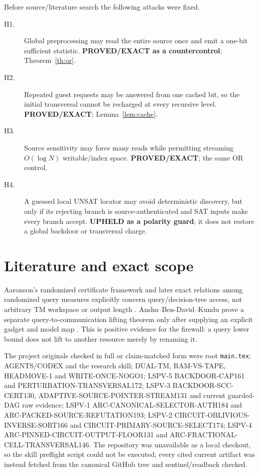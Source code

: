 \documentclass[11pt]{article}
\begin{document}
Before source/literature search the following attacks were fixed.
\begin{description}
\item[H1.] Global preprocessing may read the entire source once and emit a one-bit sufficient statistic.  \textbf{PROVED/EXACT as a countercontrol}; Theorem~\ref{th:or}.
\item[H2.] Repeated guest requests may be answered from one cached bit, so the initial transversal cannot be recharged at every recursive level.  \textbf{PROVED/EXACT}; Lemma~\ref{lem:cache}.
\item[H3.] Source sensitivity may force many reads while permitting streaming $O(\log N)$ writable/index space.  \textbf{PROVED/EXACT}; the same OR control.
\item[H4.] A guessed local UNSAT locator may avoid deterministic discovery, but only if its rejecting branch is source-authenticated and SAT inputs make every branch accept.  \textbf{UPHELD as a polarity guard}; it does not restore a global backdoor or transversal charge.
\end{description}

\section{Literature and exact scope}
Aaronson's randomized certificate framework and later exact relations among randomized query measures explicitly concern query/decision-tree access, not arbitrary TM workspace or output length \cite{aaronson,gavinsky}.  Anshu--Ben-David--Kundu prove a separate query-to-communication lifting theorem only after supplying an explicit gadget and model map \cite{abk}.  This is positive evidence for the firewall: a query lower bound does not lift to another resource merely by renaming it.

The project originals checked in full or claim-matched form were root \texttt{main.tex}; AGENTS/CODEX and the research skill; DUAL-TM, RAM-VS-TAPE, HEADMOVE-1 and WRITE-ONCE-NOGO1; LSPV-5 BACKDOOR-CAP161 and PERTURBATION-TRANSVERSAL172; LSPV-3 BACKDOOR-SCC-CERT130, ADAPTIVE-SOURCE-POINTER-STREAM131 and current guarded-DAG raw evidence; LSPV-1 ARC-CANONICAL-SELECTOR-AUTH184 and ARC-PACKED-SOURCE-REFUTATION193; LSPV-2 CIRCUIT-OBLIVIOUS-INVERSE-SORT166 and CIRCUIT-PRIMARY-SOURCE-SELECT174; LSPV-4 ARC-PINNED-CIRCUIT-OUTPUT-FLOOR131 and ARC-FRACTIONAL-CELL-TRANSVERSAL146.  The repository was unavailable as a local checkout, so the skill preflight script could not be executed; every cited current artifact was instead fetched from the canonical GitHub tree and sentinel/readback checked.
\end{document}
